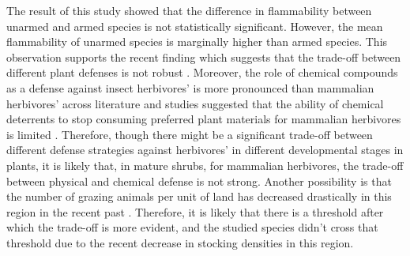 \documentclass[12pt]{report}
\begin{document}
The result of this study showed that the difference in flammability between unarmed and armed species is not statistically significant. However, the mean flammability of unarmed species is marginally higher than armed species. This observation supports the recent finding which suggests that the trade-off between different plant defenses is not robust \citep{moles2013correlations}. Moreover, the role of chemical compounds as a defense against insect herbivores' \citep{herms1992dilemma, ohgushi2005indirect} is more pronounced than mammalian herbivores' \citep{wigley2015mammal} across literature and
studies suggested that the ability of chemical deterrents to stop consuming preferred plant materials for mammalian herbivores is limited \citep{cooper1985condensed, cooper1988foliage}. Therefore, though there might be a significant trade-off between different defense strategies against herbivores' in different developmental stages in plants, it is likely that, in mature shrubs, for mammalian herbivores, the trade-off between physical and chemical defense is not strong. Another possibility is that the number of grazing animals per unit of land has decreased drastically in this region in the recent past \citep{wilcox2012historicalgrazing2}. Therefore, it is likely that there is a threshold after which the
trade-off is more evident, and the studied species didn’t cross that threshold due to
the recent decrease in stocking densities in this region.\\







\end{document}
